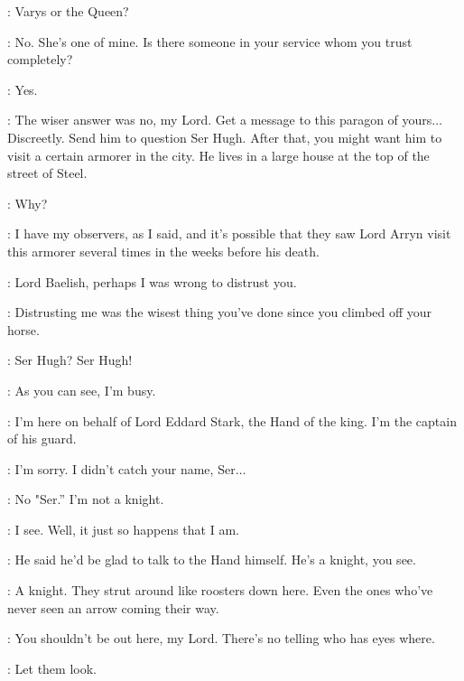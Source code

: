\NED: Varys or the Queen? 

\LITTLEFINGER: No. She's one of mine. Is there someone in your service whom you trust completely? 

\NED: Yes. 

\LITTLEFINGER: The wiser answer was no, my Lord. Get a message to this paragon of yours$\ldots$ Discreetly. Send him to question Ser Hugh. After that, you might want him to visit a certain armorer in the city. He lives in a large house at the top of the street of Steel. 

\NED: Why? 

\LITTLEFINGER: I have my observers, as I said, and it's possible that they saw Lord Arryn visit this armorer several times in the weeks before his death. 

\NED: Lord Baelish, perhaps I was wrong to distrust you. 

\LITTLEFINGER: Distrusting me was the wisest thing you've done since you climbed off your horse. 

\scene


\JORY: Ser Hugh? Ser Hugh! 

\SERHUGH: As you can see, I'm busy. 

\JORY: I'm here on behalf of Lord Eddard Stark, the Hand of the king. I'm the captain of his guard. 

\SERHUGH: I'm sorry. I didn't catch your name, Ser$\ldots$ 

\JORY: No "Ser.'' I'm not a knight. 

\SERHUGH: I see. Well, it just so happens that I am. 

\scene



\JORY: He said he'd be glad to talk to the Hand himself. He's a knight, you see. 

\NED: A knight. They strut around like roosters down here. Even the ones who've never seen an arrow coming their way. 

\JORY: You shouldn't be out here, my Lord. There's no telling who has eyes where. 

\NED: Let them look. 


